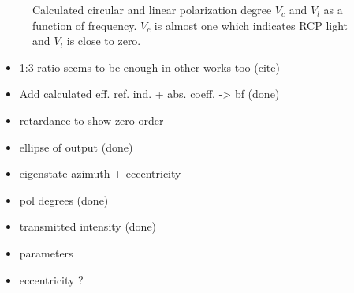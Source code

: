 \begin{figure}[H]
    \centering
    
    \caption{Calculated circular and linear polarization degree $V_c$ and $V_l$ as a function of frequency. $V_c$ is almost one which indicates RCP light and $V_l$ is close to zero.}
    \label{fig:polymer_pol_deg}
\end{figure}



\begin{itemize}
    \item 1:3 ratio seems to be enough in other works too (cite)
    \item Add calculated eff. ref. ind. + abs. coeff. -> bf (done)
    \item retardance to show zero order
    \item ellipse of output (done)
    \item eigenstate azimuth + eccentricity
    \item pol degrees (done)
    \item transmitted intensity (done)
    \item parameters
    \item eccentricity ? 
\end{itemize}



